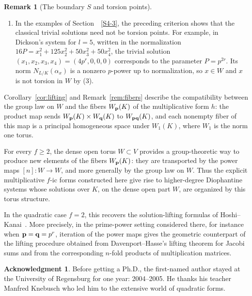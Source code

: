 \documentclass[a4paper, 11pt]{amsart}
\theoremstyle{plain}
\theoremstyle{definition}
\newtheorem{remark}[thm]{Remark}
\newtheorem*{acknowledgment}{Acknowledgment}
\numberwithin{equation}{section}
\begin{document}
\begin{remark}[The boundary $S$ and torsion points]
\begin{enumerate}
\item
In the examples of Section~~\ref{S4-3}, the preceding criterion shows
that the classical trivial solutions need not be torsion points.  
For example, in Dickson's system for $l=5$, written in the normalization
$16P=x_1^2+125x_2^2+50x_3^2+50x_4^2$, the trivial solution
$(x_1,x_2,x_3,x_4)=(4p^r,0,0,0)$ corresponds to the parameter $P=p^{2r}$.
Its norm $N_{L/K}(\alpha_x)$ is a nonzero $p$-power up to normalization, so
$x\in W$ and $x$ is not torsion in $W$ by (3).
\end{enumerate}

\end{remark}

Corollary~\ref{cor:lifting} and Remark~\ref{rem:fibers} describe the compatibility between the group law on $W$ and 
the fibers $W_{\bf p}(K)$ of the multiplicative form $h$: 
the product map sends $W_{\bf p}(K)\times W_{\bf q}(K)$ to $W_{{\bf p}{\bf q}}(K)$, 
and each nonempty fiber of this map is a principal homogeneous space under $W_1(K)$, 
where $W_1$ is the norm one torus.

For every $f\ge 2$, the dense open torus $W\subset V$ provides a group-theoretic way to produce new elements of the fibers $W_{\bf p}(K)$: they are transported by the power maps $[n]:W\to W$, and more generally by the group law on $W$. 
Thus the explicit multiplicative $f$-ic forms constructed here give rise to higher-degree Diophantine systems whose solutions over $K$, on the dense open part $W$, are organized by this torus structure.

In the quadratic case $f=2$, this recovers the solution-lifting formulas of
Hoshi--Kanai~\cite{HK22}. 
More precisely, in the prime-power setting considered there, for instance when ${\bf p}={\bf q}=p^r$, 
iteration of the power maps gives the geometric counterpart of the lifting procedure obtained
from Davenport--Hasse's lifting theorem for Jacobi sums and from the corresponding $n$-fold products of multiplication matrices.

\begin{acknowledgment}
Before getting a Ph.D., the first-named author stayed at the
University of Regensburg for one year: 2004--2005. 
He thanks his teacher Manfred Knebusch 
who led him to the extensive world of quadratic forms. 
\end{acknowledgment}
\end{document}
